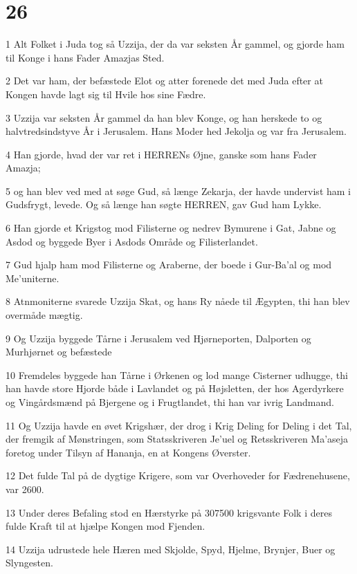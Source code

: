 \chapter{26}

\par 1 Alt Folket i Juda tog så Uzzija, der da var seksten År gammel, og gjorde ham til Konge i hans Fader Amazjas Sted.
\par 2 Det var ham, der befæstede Elot og atter forenede det med Juda efter at Kongen havde lagt sig til Hvile hos sine Fædre.
\par 3 Uzzija var seksten År gammel da han blev Konge, og han herskede to og halvtredsindstyve År i Jerusalem. Hans Moder hed Jekolja og var fra Jerusalem.
\par 4 Han gjorde, hvad der var ret i HERRENs Øjne, ganske som hans Fader Amazja;
\par 5 og han blev ved med at søge Gud, så længe Zekarja, der havde undervist ham i Gudsfrygt, levede. Og så længe han søgte HERREN, gav Gud ham Lykke.
\par 6 Han gjorde et Krigstog mod Filisterne og nedrev Bymurene i Gat, Jabne og Asdod og byggede Byer i Asdods Område og Filisterlandet.
\par 7 Gud hjalp ham mod Filisterne og Araberne, der boede i Gur-Ba'al og mod Me'uniterne.
\par 8 Atnmoniterne svarede Uzzija Skat, og hans Ry nåede til Ægypten, thi han blev overmåde mægtig.
\par 9 Og Uzzija byggede Tårne i Jerusalem ved Hjørneporten, Dalporten og Murhjørnet og befæstede
\par 10 Fremdeles byggede han Tårne i Ørkenen og lod mange Cisterner udhugge, thi han havde store Hjorde både i Lavlandet og på Højsletten, der hos Agerdyrkere og Vingårdsmænd på Bjergene og i Frugtlandet, thi han var ivrig Landmand.
\par 11 Og Uzzija havde en øvet Krigshær, der drog i Krig Deling for Deling i det Tal, der fremgik af Mønstringen, som Statsskriveren Je'uel og Retsskriveren Ma'aseja foretog under Tilsyn af Hananja, en at Kongens Øverster.
\par 12 Det fulde Tal på de dygtige Krigere, som var Overhoveder for Fædrenehusene, var 2600.
\par 13 Under deres Befaling stod en Hærstyrke på 307500 krigsvante Folk i deres fulde Kraft til at hjælpe Kongen mod Fjenden.
\par 14 Uzzija udrustede hele Hæren med Skjolde, Spyd, Hjelme, Brynjer, Buer og Slyngesten.
